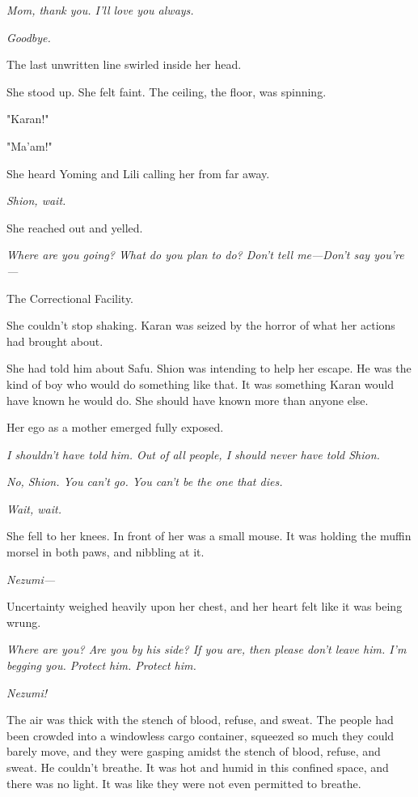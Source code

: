 \emph{Mom, thank you. I'll love you always.}

\emph{Goodbye.}

The last unwritten line swirled inside her head.

She stood up. She felt faint. The ceiling, the floor, was spinning.

"Karan!"

"Ma'am!"

She heard Yoming and Lili calling her from far away.

\emph{Shion, wait.}

She reached out and yelled.

\emph{Where are you going? What do you plan to do? Don't tell me---Don't
say you're---}

The Correctional Facility.

She couldn't stop shaking. Karan was seized by the horror of what her
actions had brought about.

She had told him about Safu. Shion was intending to help her escape. He
was the kind of boy who would do something like that. It was something
Karan would have known he would do. She should have known more than
anyone else.

Her ego as a mother emerged fully exposed.

\emph{I shouldn't have told him. Out of all people, I should never have
told Shion.}

\emph{No, Shion. You can't go. You can't be the one that dies.}

\emph{Wait, wait.}

She fell to her knees. In front of her was a small mouse. It was holding
the muffin morsel in both paws, and nibbling at it.

\emph{Nezumi---}

Uncertainty weighed heavily upon her chest, and her heart felt like it
was being wrung.

\emph{Where are you? Are you by his side? If you are, then please don't leave
him. I'm begging you. Protect him. Protect him.}

\emph{Nezumi!}

\myspace

The air was thick with the stench of blood, refuse, and sweat. The
people had been crowded into a windowless cargo container, squeezed so
much they could barely move, and they were gasping amidst the stench of
blood, refuse, and sweat. He couldn't breathe. It was hot and humid in
this confined space, and there was no light. It was like they were not
even permitted to breathe.

